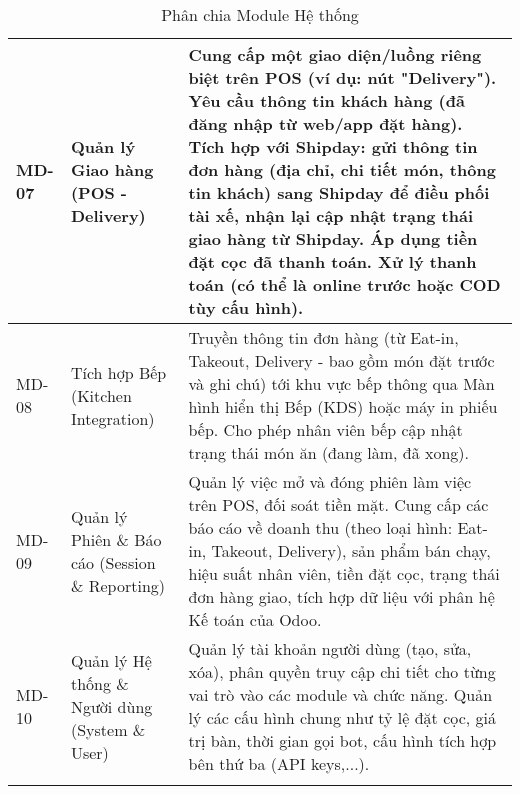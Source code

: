 \begin{longtable}{|m{1.5cm}|m{4.5cm}|m{9cm}|}
\hline
MD-07 & Quản lý Giao hàng (POS - Delivery) & Cung cấp một giao diện/luồng riêng biệt trên POS (ví dụ: nút "Delivery"). Yêu cầu thông tin khách hàng (đã đăng nhập từ web/app đặt hàng). Tích hợp với Shipday: gửi thông tin đơn hàng (địa chỉ, chi tiết món, thông tin khách) sang Shipday để điều phối tài xế, nhận lại cập nhật trạng thái giao hàng từ Shipday. Áp dụng tiền đặt cọc đã thanh toán. Xử lý thanh toán (có thể là online trước hoặc COD tùy cấu hình). \\
\hline
MD-08 & Tích hợp Bếp (Kitchen Integration) & Truyền thông tin đơn hàng (từ Eat-in, Takeout, Delivery - bao gồm món đặt trước và ghi chú) tới khu vực bếp thông qua Màn hình hiển thị Bếp (KDS) hoặc máy in phiếu bếp. Cho phép nhân viên bếp cập nhật trạng thái món ăn (đang làm, đã xong). \\
\hline
MD-09 & Quản lý Phiên \& Báo cáo (Session \& Reporting) & Quản lý việc mở và đóng phiên làm việc trên POS, đối soát tiền mặt. Cung cấp các báo cáo về doanh thu (theo loại hình: Eat-in, Takeout, Delivery), sản phẩm bán chạy, hiệu suất nhân viên, tiền đặt cọc, trạng thái đơn hàng giao, tích hợp dữ liệu với phân hệ Kế toán của Odoo. \\
\hline
MD-10 & Quản lý Hệ thống \& Người dùng (System \& User) & Quản lý tài khoản người dùng (tạo, sửa, xóa), phân quyền truy cập chi tiết cho từng vai trò vào các module và chức năng. Quản lý các cấu hình chung như tỷ lệ đặt cọc, giá trị bàn, thời gian gọi bot, cấu hình tích hợp bên thứ ba (API keys,...). \\
\hline
\caption{Phân chia Module Hệ thống} \label{tab:modules} \\

\end{longtable}



% 
% 
% 
% 
% 
% 
% 

% 
